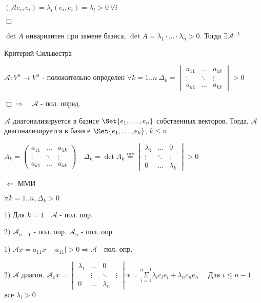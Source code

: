 \documentclass[12pt]{article}
\begin{document}
    $(\mathcal{A}e_i, e_i) = \lambda_i (e_i, e_i) = \lambda_i > 0 \ \forall i$

    $\Box$

    \Nota $\det A$ инвариантен при замене базиса, $\det A = \lambda_1 \cdot \dots \cdot \lambda_n > 0$. Тогда $\exists \mathcal{A}^{-1}$

    \hypertarget{criterionSilvester}{}

    \Th Критерий Сильвестра

    $\mathcal{A}: V^n \to V^n$ - положительно определен \Longleftrightarrow $\forall k = 1..n \ \Delta_k =
    \begin{vmatrix}a_{11} & \dots & a_{1k} \\ \vdots & \ddots & \vdots \\ a_{k1} & \dots & a_{kk}\end{vmatrix} > 0$

    $\Box \Longrightarrow \quad \mathcal{A}$ - пол. опред.

    $\mathcal{A}$ диагонализируется в базисе $\Set{e_1, \dots, e_n}$ собственных векторов.
    Тогда, $\mathcal{A}$ диагонализируется в базисе $\Set{e_1, \dots, e_k}$, $k \leq n$

    $A_k = \begin{pmatrix}a_{11} & \dots & a_{1k} \\ \vdots & \ddots & \vdots \\ a_{k1} & \dots & a_{kk}\end{pmatrix} \quad
    \Delta_k = \det A_k \stackrel{inv}{=} \begin{vmatrix}\lambda_{1} & \dots & 0 \\ \vdots & \ddots & \vdots \\ 0 & \dots & \lambda_{k}\end{vmatrix} > 0$

    $\Longleftarrow$ ММИ

    $\forall k = 1..n, \Delta_k > 0$

    1) Для $k = 1 \quad \mathcal{A}$ - пол. опр.

    2) $\mathcal{A}_{n-1}$ - пол. опр. \Longrightarrow $\mathcal{A}_n$ - пол. опр.

    1) $\mathcal{A}x = a_{11}x \quad |a_{11}| > 0 \Longrightarrow \mathcal{A}$ - пол. опр.

    2) $\mathcal{A}$ диагон. \quad $\mathcal{A}_e x =
    \begin{vmatrix}\lambda_{1} & \dots & 0 \\ & \vdots & \ddots & \vdots \\ 0 & \dots & \lambda_{n}\end{vmatrix}x =
    \overset{n - 1}{\underset{i = 1}{\Sigma}}\lambda_i c_i e_i + \lambda_n c_n e_n \quad$ Для $i \leq n - 1$ все $\lambda_i > 0$
\end{document}

